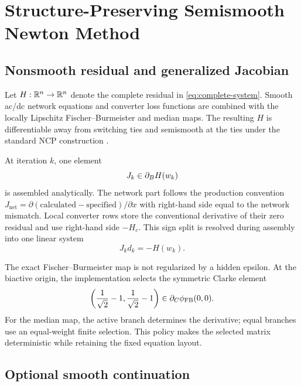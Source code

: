 \section{Structure-Preserving Semismooth Newton Method}\label{sec:ssn}

\subsection{Nonsmooth residual and generalized Jacobian}

Let $H:\mathbb{R}^n\rightarrow\mathbb{R}^n$ denote the complete residual in
\eqref{eq:complete-system}. Smooth ac/dc network equations and converter loss
functions are combined with the locally Lipschitz Fischer--Burmeister and
median maps. The resulting $H$ is differentiable away from switching ties and
semismooth at the ties under the standard NCP construction
\cite{facchinei2003complementarity,qi1993nonsmooth}.

At iteration $k$, one element
\begin{equation}
 J_k\in\partial_B H(w_k)
 \label{eq:selected-jacobian}
\end{equation}
is assembled analytically. The network part follows the production convention
$J_{\mathrm{net}}=\partial(\mathrm{calculated}-\mathrm{specified})/\partial x$
with right-hand side equal to the network mismatch. Local converter rows store
the conventional derivative of their zero residual and use right-hand side
$-H_c$. This sign split is resolved during assembly into one linear system
\begin{equation}
 J_k d_k=-H(w_k).
 \label{eq:newton-step}
\end{equation}

The exact Fischer--Burmeister map is not regularized by a hidden epsilon. At
the biactive origin, the implementation selects the symmetric Clarke element
\begin{equation}
 \left(\frac{1}{\sqrt 2}-1,
       \frac{1}{\sqrt 2}-1\right)\in
 \partial_C\phi_{\mathrm{FB}}(0,0).
 \label{eq:fb-origin}
\end{equation}
For the median map, the active branch determines the derivative; equal
branches use an equal-weight finite selection. This policy makes the selected
matrix deterministic while retaining the fixed equation layout.

\subsection{Optional smooth continuation}

